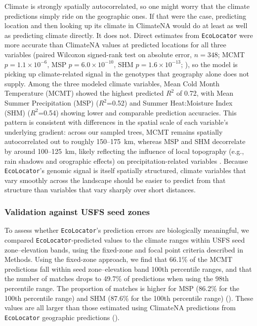 \documentclass[]{article}
\newcommand{\ecolocator}{\texttt{EcoLocator}\xspace}
\begin{document}
Climate is strongly spatially autocorrelated,
so one might worry that the climate predictions simply ride on the geographic ones.
If that were the case, predicting location and then looking up its
climate in ClimateNA would do at least as well as predicting climate directly.
It does not. Direct estimates from \ecolocator
were more accurate than ClimateNA values at predicted locations
for all three variables (paired Wilcoxon signed-rank test on absolute
error, $n=348$; MCMT $p=1.1\times10^{-6}$, MSP $p=6.0\times10^{-10}$,
SHM $p=1.6\times10^{-13}$; ),
so the model is picking up climate-related signal in the genotypes
that geography alone does not supply. Among the three modeled climate variables,
Mean Cold Month Temperature (MCMT) showed the highest predicted $R^2$ of 0.72, with Mean Summer
Precipitation (MSP) ($R^2$=0.52) and Summer Heat:Moisture Index (SHM) ($R^2$=0.54)
showing lower and comparable prediction accuracies. This pattern is consistent with
differences in the spatial scale of each variable's underlying gradient: across our
sampled trees, MCMT remains spatially autocorrelated out to roughly 150--175~km, whereas
MSP and SHM decorrelate by around 100--125~km, likely reflecting the influence of local
topography (e.g., rain shadows and orographic effects) on precipitation-related variables
\citep{frankson_oregon_2022}. Because \ecolocator's genomic signal is itself spatially
structured, climate variables that vary smoothly across the landscape should be easier
to predict from that structure than variables that vary sharply over short distances.


\subsubsection*{Validation against USFS seed zones}

To assess whether \ecolocator's prediction errors
are biologically meaningful,
we compared \ecolocator-predicted values to the climate ranges
within USFS seed zone--elevation bands,
using the fixed-zone and focal point criteria described in Methods.
Using the fixed-zone approach, we find that 66.1\%
of the MCMT predictions fall within seed zone--elevation band 100th 
percentile ranges, and that the number of matches drops to 49.7\% of predictions when using the 
98th percentile range. The proportion of matches is higher for MSP (86.2\% for the 
100th percentile range) and SHM (87.6\% for the 100th percentile range) (). 
These values are all larger than those estimated using ClimateNA predictions from 
\ecolocator geographic predictions (). 
\end{document}
